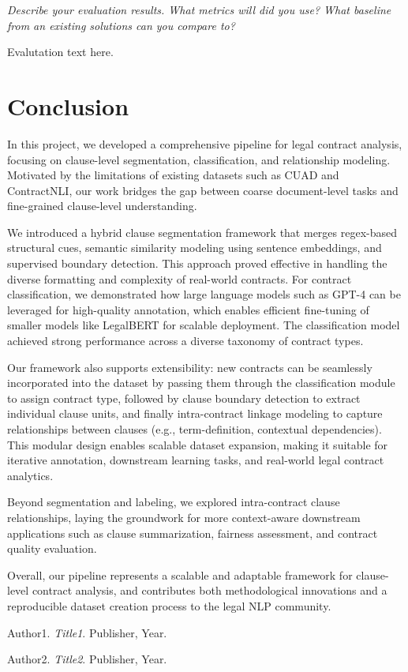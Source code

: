 \documentclass[11pt, oneside]{article}   	%
\begin{document}
\textit{Describe your evaluation results. What metrics
will did you use? What baseline from an existing solutions can you compare to?}

Evalutation text here.


\section*{Conclusion}

In this project, we developed a comprehensive pipeline for legal contract analysis, focusing on clause-level segmentation, classification, and relationship modeling. Motivated by the limitations of existing datasets such as CUAD and ContractNLI, our work bridges the gap between coarse document-level tasks and fine-grained clause-level understanding.

We introduced a hybrid clause segmentation framework that merges regex-based structural cues, semantic similarity modeling using sentence embeddings, and supervised boundary detection. This approach proved effective in handling the diverse formatting and complexity of real-world contracts. For contract classification, we demonstrated how large language models such as GPT-4 can be leveraged for high-quality annotation, which enables efficient fine-tuning of smaller models like LegalBERT for scalable deployment. The classification model achieved strong performance across a diverse taxonomy of contract types.

Our framework also supports extensibility: new contracts can be seamlessly incorporated into the dataset by passing them through the classification module to assign contract type, followed by clause boundary detection to extract individual clause units, and finally intra-contract linkage modeling to capture relationships between clauses (e.g., term-definition, contextual dependencies). This modular design enables scalable dataset expansion, making it suitable for iterative annotation, downstream learning tasks, and real-world legal contract analytics.

Beyond segmentation and labeling, we explored intra-contract clause relationships, laying the groundwork for more context-aware downstream applications such as clause summarization, fairness assessment, and contract quality evaluation.

Overall, our pipeline represents a scalable and adaptable framework for clause-level contract analysis, and contributes both methodological innovations and a reproducible dataset creation process to the legal NLP community.
\begin{thebibliography}{9}

Author1. 
\textit{Title1}.
Publisher, Year.

Author2. 
\textit{Title2}.
Publisher, Year.

\end{thebibliography}
\end{document}
